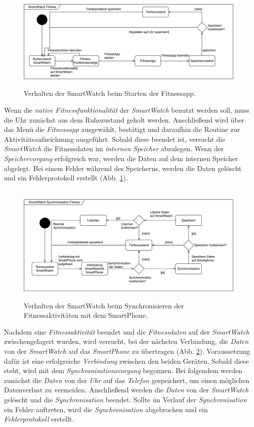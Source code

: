 \begin{figure}[h]
\centering\
\includegraphics[width=\textwidth]{img/stateFitness}
\caption[State Diagram: Fitness]{Verhalten der SmartWatch beim Starten der Fitnessapp.}
\label{fig:stateFitness}
\end{figure}
Wenn die \textit{\gls{native} Fitnessfunktionalität} der \textit{SmartWatch} benutzt werden soll, muss die Uhr zunächst aus dem Ruhezustand geholt werden. Anschließend wird über das Menü die \textit{Fitnessapp} ausgewählt, bestätigt und daraufhin die Routine zur Aktivitätsaufzeichnung ausgeführt. Sobald diese beendet ist, versucht die \textit{SmartWatch} die Fitnessdaten im \textit{internen Speicher} abzulegen. Wenn der \textit{Speichervorgang} erfolgreich war, werden die Daten auf dem internen Speicher abgelegt. Bei einem Fehler während des Speicherns, werden die Daten gelöscht und ein Fehlerprotokoll erstellt (Abb. \ref{fig:stateFitness}).\\
\begin{figure}[h]
\centering\
\includegraphics[width=\textwidth]{img/stateSync}
\caption[State Diagram: Synchronisation]{Verhalten der SmartWatch beim Synchronisieren der Fitnessaktivitäten mit dem SmartPhone.}
\label{fig:stateSync}
\end{figure}
Nachdem eine \textit{Fitnessaktivität} beendet und die \textit{Fitnessdaten} auf der \textit{SmartWatch} zwischengelagert wurden, wird versucht, bei der nächsten Verbindung, die \textit{Daten} von der \textit{SmartWatch} auf das \textit{SmartPhone} zu übertragen (Abb. \ref{fig:stateSync}). Voraussetzung dafür ist eine erfolgreiche \textit{Verbindung} zwischen den beiden Geräten. Sobald diese steht, wird mit dem \textit{Synchronisationsvorgang} begonnen. Bei folgendem werden zunächst die \textit{Daten} von der \textit{Uhr} auf das \textit{Telefon} gespeichert, um einen möglichen Datenverlust zu vermeiden. Anschließend werden die \textit{Daten} von der \textit{SmartWatch} gelöscht und die \textit{Synchronisation} beendet. Sollte im Verlauf der \textit{Synchronisation} ein Fehler auftreten, wird die \textit{Synchronisation} abgebrochen und ein \textit{Fehlerprotokoll} erstellt. \\
